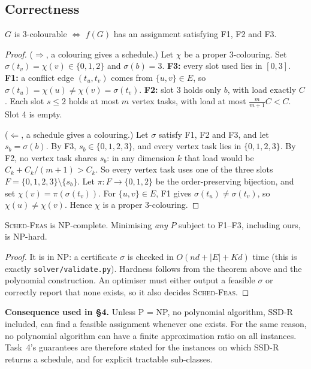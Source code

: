 \subsection{Correctness}
\begin{theorem}
$G$ is 3-colourable $\iff$ $f(G)$ has an assignment satisfying F1, F2 and F3.
\end{theorem}
\begin{proof}
($\Rightarrow$, a colouring gives a schedule.) Let $\chi$ be a proper
3-colouring. Set $\sigma(t_v)=\chi(v)\in\{0,1,2\}$ and $\sigma(b)=3$.
\textbf{F3:} every slot used lies in $[0,3]$.
\textbf{F1:} a conflict edge $(t_u,t_v)$ comes from $\{u,v\}\in E$, so
$\sigma(t_u)=\chi(u)\neq\chi(v)=\sigma(t_v)$.
\textbf{F2:} slot 3 holds only $b$, with load exactly $C$. Each slot
$s\le2$ holds at most $m$ vertex tasks, with load at most
$\frac{m}{m+1}C<C$. Slot 4 is empty.

($\Leftarrow$, a schedule gives a colouring.) Let $\sigma$ satisfy F1, F2
and F3, and let $s_b=\sigma(b)$. By F3, $s_b\in\{0,1,2,3\}$, and every
vertex task lies in $\{0,1,2,3\}$. By F2, no vertex task shares $s_b$: in
any dimension $k$ that load would be $C_k+C_k/(m+1)>C_k$. So every vertex
task uses one of the three slots $F=\{0,1,2,3\}\setminus\{s_b\}$. Let
$\pi:F\to\{0,1,2\}$ be the order-preserving bijection, and set
$\chi(v)=\pi(\sigma(t_v))$. For $\{u,v\}\in E$, F1 gives
$\sigma(t_u)\ne\sigma(t_v)$, so $\chi(u)\neq\chi(v)$. Hence $\chi$ is a
proper 3-colouring.
\end{proof}

\begin{theorem}
\textsc{Sched-Feas} is NP-complete. Minimising \emph{any} $P$ subject to
F1--F3, including ours, is NP-hard.
\end{theorem}
\begin{proof}
It is in NP: a certificate $\sigma$ is checked in $O(n d+|E|+Kd)$ time
(this is exactly \texttt{solver/validate.py}). Hardness follows from the
theorem above and the polynomial construction. An optimiser must either
output a feasible $\sigma$ or correctly report that none exists, so it also
decides \textsc{Sched-Feas}.
\end{proof}

\textbf{Consequence used in \S4.} Unless P = NP, no polynomial algorithm,
SSD-R included, can find a feasible assignment whenever one exists. For the
same reason, no polynomial algorithm can have a finite approximation ratio
on all instances. Task~4's guarantees are therefore stated for the
instances on which SSD-R returns a schedule, and for explicit tractable
sub-classes.

